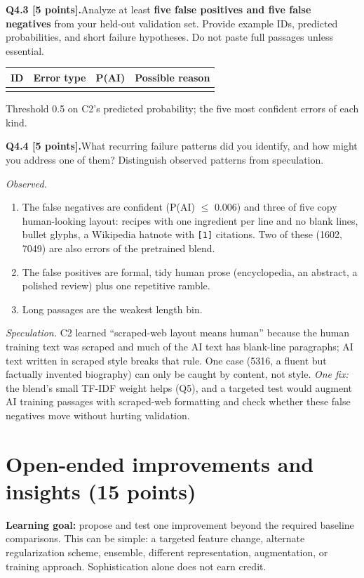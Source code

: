 \documentclass[11pt,letterpaper]{article}
\newcommand{\question}[2]{\needspace{4\baselineskip}\par\addvspace{0.45em}\noindent\textbf{#1}\quad #2\par\nobreak\vspace{0.1em}}
\newcommand{\smallnote}[1]{{\small\color{muted}#1}}
\begin{document}
\question{Q4.3 [5 points].}{Analyze at least \textbf{five false positives and five false negatives} from your held-out validation set. Provide example IDs, predicted probabilities, and short failure hypotheses. Do not paste full passages unless essential.}
{\small\begin{tabularx}{\linewidth}{@{}p{0.5in}p{0.5in}p{0.42in}Y@{}}\toprule ID & Error type & P(AI) & Possible reason \\ \midrule
{}
\bottomrule\end{tabularx}}
\smallnote{Threshold 0.5 on C2's predicted probability; the five most confident errors of each kind.}

\question{Q4.4 [5 points].}{What recurring failure patterns did you identify, and how might you address one of them? Distinguish observed patterns from speculation.}
\textit{Observed.}
\begin{enumerate}
\item The false negatives are confident (P(AI) $\le$ 0.006) and three of five copy human-looking layout: recipes with one ingredient per line and no blank lines, bullet glyphs, a Wikipedia hatnote with \texttt{[1]} citations. Two of these (1602, 7049) are also errors of the pretrained blend.
\item The false positives are formal, tidy human prose (encyclopedia, an abstract, a polished review) plus one repetitive ramble.
\item Long passages are the weakest length bin.
\end{enumerate}
\textit{Speculation.} C2 learned ``scraped-web layout means human'' because the human training text was scraped and much of the AI text has blank-line paragraphs; AI text written in scraped style breaks that rule. One case (5316, a fluent but factually invented biography) can only be caught by content, not style. \textit{One fix:} the blend's small TF-IDF weight helps (Q5), and a targeted test would augment AI training passages with scraped-web formatting and check whether these false negatives move without hurting validation.

\newpage
\section{Open-ended improvements and insights (15 points)}
\textbf{Learning goal:} propose and test one improvement beyond the required baseline comparisons. This can be simple: a targeted feature change, alternate regularization scheme, ensemble, different representation, augmentation, or training approach. Sophistication alone does not earn credit.
\end{document}
